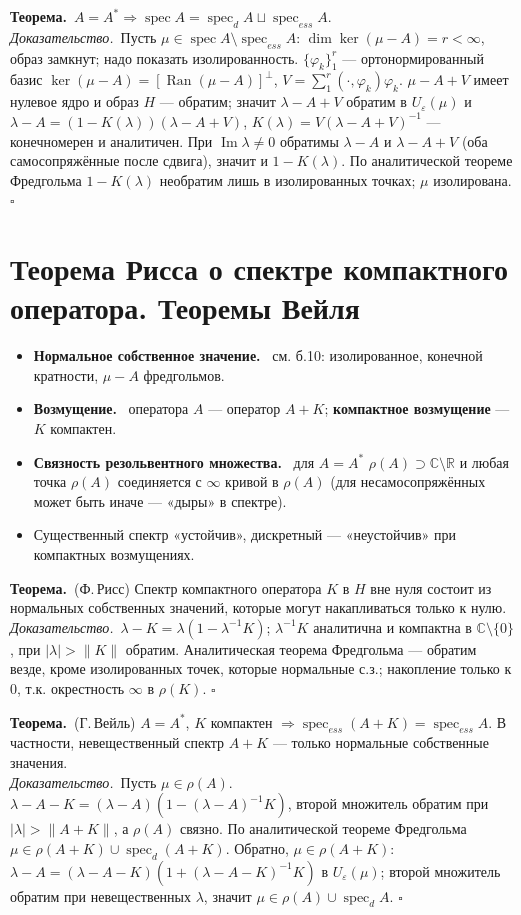 \documentclass[11pt,a4paper]{article}
\newcommand{\CC}{\mathbb C}
\newcommand{\RR}{\mathbb R}
\newcommand{\spec}{\operatorname{spec}}
\newcommand{\Ran}{\operatorname{Ran}}
\newcommand{\df}[1]{\textbf{#1.}~}
\newcommand{\thm}{\textbf{Теорема.}~}
\newcommand{\pf}{\textit{Доказательство.}~}
\newcommand{\qedd}{\hfill$\square$}
\begin{document}
\thm $A=A^*\Rightarrow\spec A=\spec_dA\sqcup\spec_{ess}A$.\\
\pf Пусть $\mu\in\spec A\setminus\spec_{ess}A$: $\dim\ker(\mu-A)=r<\infty$, образ замкнут; надо показать изолированность. $\{\varphi_k\}_1^r$ — ортонормированный базис $\ker(\mu-A)=[\Ran(\mu-A)]^\perp$, $V=\sum_1^r(\cdot,\varphi_k)\varphi_k$. $\mu-A+V$ имеет нулевое ядро и образ $H$ — обратим; значит $\lambda-A+V$ обратим в $U_\varepsilon(\mu)$ и $\lambda-A=(1-K(\lambda))(\lambda-A+V)$, $K(\lambda)=V(\lambda-A+V)^{-1}$ — конечномерен и аналитичен. При $\operatorname{Im}\lambda\ne0$ обратимы $\lambda-A$ и $\lambda-A+V$ (оба самосопряжённые после сдвига), значит и $1-K(\lambda)$. По аналитической теореме Фредгольма $1-K(\lambda)$ необратим лишь в изолированных точках; $\mu$ изолирована. \qedd

\section{Теорема Рисса о спектре компактного оператора. Теоремы Вейля}
\begin{defs}
\begin{itemize}
\item \df{Нормальное собственное значение} см. б.10: изолированное, конечной кратности, $\mu-A$ фредгольмов.
\item \df{Возмущение} оператора $A$ — оператор $A+K$; \textbf{компактное возмущение} — $K$ компактен.
\item \df{Связность резольвентного множества} для $A=A^*$ $\rho(A)\supset\CC\setminus\RR$ и любая точка $\rho(A)$ соединяется с $\infty$ кривой в $\rho(A)$ (для несамосопряжённых может быть иначе — «дыры» в спектре).
\item Существенный спектр «устойчив», дискретный — «неустойчив» при компактных возмущениях.
\end{itemize}
\end{defs}

\thm (Ф.\,Рисс) Спектр компактного оператора $K$ в $H$ вне нуля состоит из нормальных собственных значений, которые могут накапливаться только к нулю.\\
\pf $\lambda-K=\lambda(1-\lambda^{-1}K)$; $\lambda^{-1}K$ аналитична и компактна в $\CC\setminus\{0\}$, при $|\lambda|>\|K\|$ обратим. Аналитическая теорема Фредгольма — обратим везде, кроме изолированных точек, которые нормальные с.з.; накопление только к $0$, т.к. окрестность $\infty$ в $\rho(K)$. \qedd

\thm (Г.\,Вейль) $A=A^*$, $K$ компактен $\Rightarrow\spec_{ess}(A+K)=\spec_{ess}A$. В частности, невещественный спектр $A+K$ — только нормальные собственные значения.\\
\pf Пусть $\mu\in\rho(A)$. $\lambda-A-K=(\lambda-A)(1-(\lambda-A)^{-1}K)$, второй множитель обратим при $|\lambda|>\|A+K\|$, а $\rho(A)$ связно. По аналитической теореме Фредгольма $\mu\in\rho(A+K)\cup\spec_d(A+K)$. Обратно, $\mu\in\rho(A+K)$: $\lambda-A=(\lambda-A-K)(1+(\lambda-A-K)^{-1}K)$ в $U_\varepsilon(\mu)$; второй множитель обратим при невещественных $\lambda$, значит $\mu\in\rho(A)\cup\spec_dA$. \qedd
\end{document}
